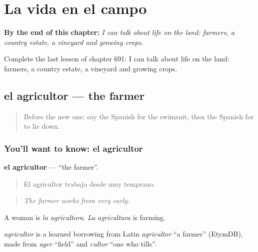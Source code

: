 
\chapter{La vida en el campo}
\label{ch:es-la-vida-en-el-campo}

\begin{chapteropening}
\textbf{By the end of this chapter:} \emph{I can talk about life on the land: farmers, a country estate, a vineyard and growing crops.}

Complete the last lesson of chapter 691: I can talk about life on the land: farmers, a country estate, a vineyard and growing crops.
\end{chapteropening}

\section[el agricultor]{el agricultor — the farmer}

\label{lesson:ES-C691-agricultor}



\begin{quote}
Before the new one: say the Spanish for the swimsuit, then the Spanish for to lie down.
\end{quote}

\subsection*{You'll want to know: el agricultor}
\textbf{el agricultor} — \textquotedblleft{}the farmer\textquotedblright{}.

\begin{quote}
El agricultor trabaja desde muy temprano.
\end{quote}

\begin{quote}
\emph{The farmer works from very early.}
\end{quote}

A woman is \emph{la agricultora}. \emph{La agricultura} is farming.

\begin{cousinweb}
\emph{agricultor} is a learned borrowing from Latin \emph{agricultor} \textquotedblleft{}a farmer\textquotedblright{} (EtymDB), made from \emph{ager} \textquotedblleft{}field\textquotedblright{} and \emph{cultor} \textquotedblleft{}one who tills\textquotedblright{}.
\end{cousinweb}


